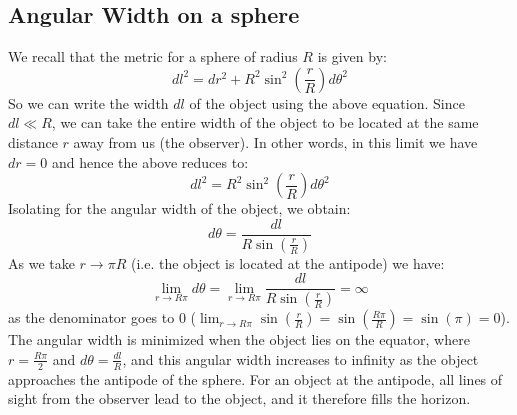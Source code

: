 \subsection{Angular Width on a sphere}
We recall that the metric for a sphere of radius $R$ is given by:
\begin{equation}
    dl^2 = dr^2 + R^2\sin^2\left(\frac{r}{R}\right)d\theta^2
\end{equation}
So we can write the width $dl$ of the object using the above equation. Since $dl \ll R$, we can take the entire width of the object to be located at the same distance $r$ away from us (the observer). In other words, in this limit we have $dr = 0$ and hence the above reduces to:
\begin{equation}
    dl^2 = R^2\sin^2\left(\frac{r}{R}\right)d\theta^2
\end{equation}
Isolating for the angular width of the object, we obtain:
\begin{equation}
    \boxed{d\theta = \frac{dl}{R\sin(\frac{r}{R})}}
\end{equation}
As we take $r \to \pi R$ (i.e. the object is located at the antipode) we have:
\begin{equation}
   \lim_{r \to R\pi} d\theta = \lim_{r \to R\pi} \frac{dl}{R\sin(\frac{r}{R})} = \infty
\end{equation}
as the denominator goes to 0 ($\lim_{r \to R\pi}\sin(\frac{r}{R}) = \sin(\frac{R\pi}{R}) = \sin(\pi) = 0$). The angular width is minimized when the object lies on the equator, where $r = \frac{R\pi}{2}$ and $d\theta = \frac{dl}{R}$, and this angular width increases to infinity as the object approaches the antipode of the sphere. For an object at the antipode, all lines of sight from the observer lead to the object, and it therefore fills the horizon.

